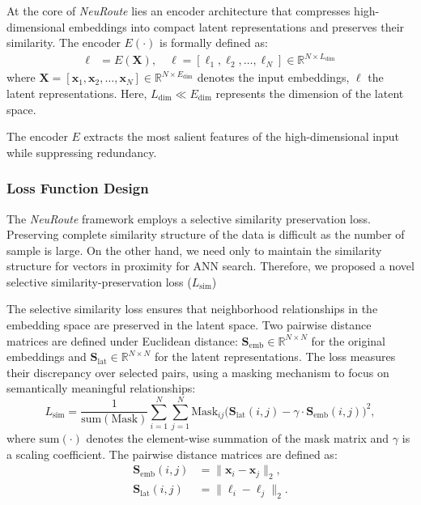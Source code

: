 \documentclass[sigconf, nonacm]{acmart}
\begin{document}
At the core of \textit{NeuRoute} lies an encoder architecture that compresses high-dimensional embeddings into compact latent representations and preserves their similarity. The encoder $E(\cdot)$  is formally defined as:
\begin{align}
 \boldsymbol{\ell} &= E(\mathbf{X}), \quad \boldsymbol{\ell} = [\boldsymbol{\ell}_1, \boldsymbol{\ell}_2, \dots, \boldsymbol{\ell}_N] \in \mathbb{R}^{N \times L_{\text{dim}}}
\end{align}
where $\mathbf{X} = [\mathbf{x}_1, \mathbf{x}_2, \dots, \mathbf{x}_N] \in \mathbb{R}^{N \times E_{\text{dim}}}$ denotes the input embeddings, $\boldsymbol{\ell}$ the latent representations. Here, $L_{\text{dim}} \ll E_{\text{dim}}$ represents the dimension of the latent space.

The encoder $E$ extracts the most salient features of the high-dimensional input while suppressing redundancy. 

\subsubsection{Loss Function Design}
\label{lossfunction}

The \textit{NeuRoute} framework employs a selective similarity preservation loss. Preserving complete similarity structure of the data is difficult as the number of sample is large. On the other hand, we need only to maintain the similarity structure for vectors in proximity for ANN search. Therefore, we proposed a novel selective similarity-preservation loss ($L_{\text{sim}}$)

The selective similarity loss ensures that neighborhood relationships in the embedding space are preserved in the latent space.
Two pairwise distance matrices are defined under Euclidean distance:
$\mathbf{S}_{\text{emb}} \in \mathbb{R}^{N \times N}$ for the original embeddings and
$\mathbf{S}_{\text{lat}} \in \mathbb{R}^{N \times N}$ for the latent representations.
The loss measures their discrepancy over selected pairs, using a masking mechanism to focus on semantically meaningful relationships:
\begin{equation}
\label{similarityconfig}
L_{\text{sim}} = \frac{1}{\mathrm{sum}(\mathrm{Mask})} 
\sum_{i=1}^{N} \sum_{j=1}^{N}
\mathrm{Mask}_{ij}
\Big(
  \mathbf{S}_{\text{lat}}(i,j)
  - \gamma \cdot
  \mathbf{S}_{\text{emb}}(i,j)
\Big)^{2},
\end{equation}
where $\mathrm{sum}(\cdot)$ denotes the element-wise summation of the mask matrix and $\gamma$ is a scaling coefficient.
The pairwise distance matrices are defined as:
\begin{align}
\mathbf{S}_{\text{emb}}(i,j) &= \|\mathbf{x}_i - \mathbf{x}_j\|_2, \\
\mathbf{S}_{\text{lat}}(i,j) &= \|\boldsymbol{\ell}_i - \boldsymbol{\ell}_j\|_2.
\end{align}
\end{document}
